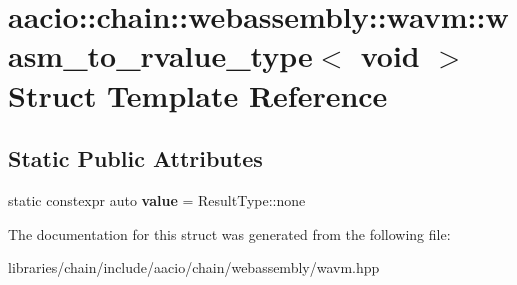 \hypertarget{structaacio_1_1chain_1_1webassembly_1_1wavm_1_1wasm__to__rvalue__type_3_01void_01_4}{}\section{aacio\+:\+:chain\+:\+:webassembly\+:\+:wavm\+:\+:wasm\+\_\+to\+\_\+rvalue\+\_\+type$<$ void $>$ Struct Template Reference}
\label{structaacio_1_1chain_1_1webassembly_1_1wavm_1_1wasm__to__rvalue__type_3_01void_01_4}
\subsection*{Static Public Attributes}
\begin{DoxyCompactItemize}
\item 
\mbox{\label{structaacio_1_1chain_1_1webassembly_1_1wavm_1_1wasm__to__rvalue__type_3_01void_01_4_a1cc81128236027f348c80c715b36a50a}} 
static constexpr auto {\bfseries value} = Result\+Type\+::none
\end{DoxyCompactItemize}


The documentation for this struct was generated from the following file\+:\begin{DoxyCompactItemize}
\item 
libraries/chain/include/aacio/chain/webassembly/wavm.\+hpp\end{DoxyCompactItemize}
